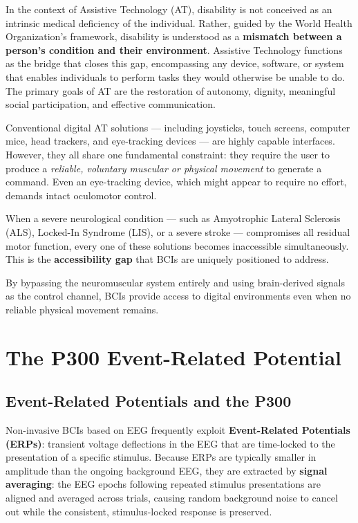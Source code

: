 \documentclass[10pt, letterpaper]{report}
\begin{document}
In the context of Assistive Technology (AT), disability is not conceived as an intrinsic medical
deficiency of the individual. Rather, guided by the World Health Organization's framework,
disability is understood as a \textbf{mismatch between a person's condition and their
environment}. Assistive Technology functions as the bridge that closes this gap, encompassing
any device, software, or system that enables individuals to perform tasks they would
otherwise be unable to do. The primary goals of AT are the restoration of autonomy, dignity,
meaningful social participation, and effective communication.\bigskip



Conventional digital AT solutions — including joysticks, touch screens, computer mice, head
trackers, and eye-tracking devices — are highly capable interfaces. However, they all share
one fundamental constraint: they require the user to produce a \emph{reliable, voluntary
muscular or physical movement} to generate a command. Even an eye-tracking device, which
might appear to require no effort, demands intact oculomotor control.

When a severe neurological condition — such as Amyotrophic Lateral Sclerosis (ALS),
Locked-In Syndrome (LIS), or a severe stroke — compromises all residual motor function,
every one of these solutions becomes inaccessible simultaneously. This is the
\textbf{accessibility gap} that BCIs are uniquely positioned to address.

By bypassing the neuromuscular system entirely and using brain-derived signals as the
control channel, BCIs provide access to digital environments even when no reliable physical
movement remains.

\section{The P300 Event-Related Potential}

\subsection{Event-Related Potentials and the P300}

Non-invasive BCIs based on EEG frequently exploit \textbf{Event-Related Potentials (ERPs)}:
transient voltage deflections in the EEG that are time-locked to the presentation of a specific
stimulus. Because ERPs are typically smaller in amplitude than the ongoing background EEG,
they are extracted by \textbf{signal averaging}: the EEG epochs following repeated stimulus
presentations are aligned and averaged across trials, causing random background noise to
cancel out while the consistent, stimulus-locked response is preserved.
\end{document}

